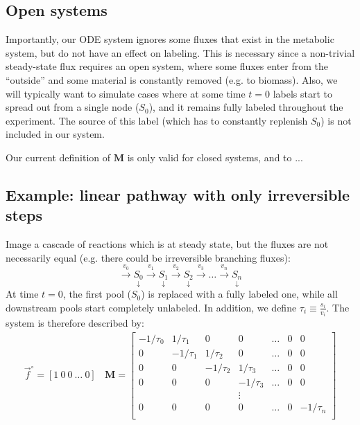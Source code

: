 \documentclass{article}
\newcommand{\finit}{\ensuremath{\vec{f}^\circ}}
\begin{document}
\subsection{Open systems}
Importantly, our ODE system ignores some fluxes that exist in the metabolic system, but do not have an effect on labeling. This is necessary since a non-trivial steady-state flux requires an open system, where some fluxes enter from the ``outside'' and some material is constantly removed (e.g. to biomass). Also, we will typically want to simulate cases where at some time $t=0$ labels start to spread out from a single node ($S_0$), and it remains fully labeled throughout the experiment. The source of this label (which has to constantly replenish $S_0$) is not included in our system.

Our current definition of $\mathbf{M}$ is only valid for closed systems, and to ...

\subsection{Example: linear pathway with only irreversible steps}
Image a cascade of reactions which is at steady state, but the fluxes are not necessarily equal (e.g. there could be irreversible branching fluxes):
\begin{equation}
    \xrightarrow{v_0} \underset{\downarrow}{S_0} 
    \xrightarrow{v_1} \underset{\downarrow}{S_1} 
    \xrightarrow{v_2} \underset{\downarrow}{S_2}
    \xrightarrow{v_3} \ldots 
    \xrightarrow{v_n} \underset{\downarrow}{S_n}
\end{equation}
At time $t = 0$, the first pool ($S_0$) is replaced with a fully labeled one, while all downstream pools start completely unlabeled. In addition, we define $\tau_i \equiv \frac{s_i}{v_i}$. The system is therefore described by:
\begin{eqnarray}
\finit = \left[1~0~0~\ldots~0\right]
~~~~
\mathbf{M} =
  \begin{bmatrix}
    -1/\tau_0 & 1/\tau_1 & 0 & 0 & \ldots & 0 & 0\\
    0 & -1/\tau_1 & 1/\tau_2 & 0 & \ldots & 0 & 0\\
    0 & 0 & -1/\tau_2 & 1/\tau_3 & \ldots & 0 & 0\\
    0 & 0 & 0 & -1/\tau_3 & \ldots & 0 & 0\\
    & & & \vdots & & &\\
    0 & 0 & 0 & 0 & \ldots & 0 & -1/\tau_n \\
  \end{bmatrix}
\end{eqnarray}
\end{document}
